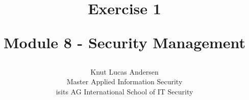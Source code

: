 \title{ 
	\begin{center} \textbf{ Exercise 1 } \end{center}
	\begin{center} {\large Module 8 - Security Management } \end{center}
}

\author{ 
	Knut Lucas Andersen \\
	Master Applied Information Security \\
	isits AG International School of IT Security
}